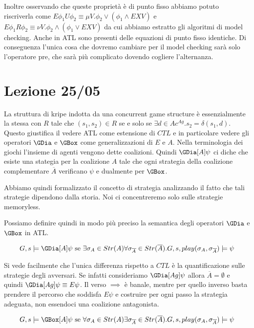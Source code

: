 Inoltre osservando che queste proprietà è di punto fisso abbiamo potuto riscriverla come \(E \phi_1 U \phi_2 \equiv \mu V. \phi_2 \lor (\phi_1 \land EX V)\) e \(E \phi_1 R \phi_2 \equiv \nu V. \phi_2 \land (\phi_1 \lor EX V)\) da cui abbiamo estratto gli algoritmi di model checking. Anche in ATL sono presenti delle equazioni di punto fisso identiche. Di conseguenza l'unica cosa che dovremo cambiare per il model checking sarà solo l'operatore pre, che sarà più complicato dovendo cogliere l'alternanza.

\chapter{Lezione 25/05}

La struttura di kripe indotta da una concurrent game structure è essenzialmente la stessa con \(R\) tale che \((s_1,s_2) \in R\) se e solo se \(\exists d \in Ac^{Ag}. s_2 = \delta(s_1,d)\). Questo giustifica il vedere ATL come estensione di \(CTL\) e in particolare vedere gli operatori \(\GDia\) e \(\GBox\) come generalizzazioni di \(E\) e \(A\). Nella terminologia dei giochi l'insieme di agenti vengono dette coalizioni. Quindi \(\GDia[A] \psi\) ci diche che esiste una stategia per la coalizione \(A\) tale che ogni strategia della coalizione complementare \(\overline{A}\) verificano \(\psi\) e dualmente per \(\GBox\).

Abbiamo quindi formalizzato il concetto di strategia analizzando il fatto che tali strategie dipendono dalla storia. Noi ci concentreremo solo sulle strategie memoryless.

Possiamo definire quindi in modo più preciso la semantica degli operatori \(\GDia\) e \(\GBox\) in ATL\@.

\[G,s\models \GDia[A] \psi \text{ se } \exists \sigma_A \in Str(A) \forall \sigma_{\overline{A}} \in Str(\overline{A}). G,s,play(\sigma_A,\sigma_{\overline{A}})\models \psi \]

Si vede facilmente che l'unica differenza rispetto a \(CTL\) è la quantificazione sulle strategie degli avversari. Se infatti consideriamo \(\GDia[Ag] \psi\) allora \(\overline{A} = \emptyset\) e quindi \(\GDia[Ag] \psi\equiv E\psi\). Il verso \(\implies\) è banale, mentre per quello inverso basta prendere il percorso che soddisfa \(E\psi\) e costruire per ogni passo la strategia adeguata, non essendoci una coalizione antagonista.

\[G,s\models \GBox[A] \psi \text{ se } \forall \sigma_A \in Str(A) \exists \sigma_{\overline{A}} \in Str(\overline{A}). G,s,play(\sigma_A,\sigma_{\overline{A}})\models \psi \]

